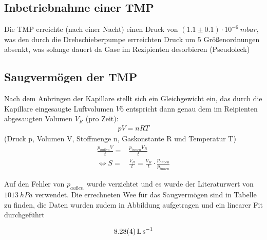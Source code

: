 \documentclass[12pt, a4paper]{scrartcl}
\begin{document}
    \subsection{Inbetriebnahme einer TMP}
    
        Die TMP erreichte (nach einer Nacht) einen Druck von 
        $(1.1\pm 0.1)\cdot10^{-6}\ mbar$, 
        was den durch die Drehschieberpumpe errreichten Druck um 5
        Größenordnungen absenkt, was solange dauert da Gase im Rezipienten desorbieren (Pseudoleck)
        
    \subsection{Saugvermögen der TMP}
        
        Nach dem Anbringen der Kapillare stellt sich ein Gleichgewicht ein, das durch die Kapillare eingesaugte Luftvolumen $V6$ entspricht dann genau dem im Reipienten abgesaugten Volumen $V_R$ (pro Zeit):
        \begin{align}
            pV=nRT
        \end{align}
        (Druck p, Volumen V, Stoffmenge n, Gaskonstante R und Temperatur T)
        \begin{align}
            \frac{p_{außen}V}{t} =& \frac{p_{innen}V_R}{t}\\
            \Leftrightarrow S=&\frac{V_R}{t}=\frac{V_R}{t}\cdot \frac{p_{außen}}{p_{innen}}
        \end{align}
	
        Auf den Fehler von $p_{außen}$ wurde verzichtet und es wurde der Literaturwert von $1013\ hPa$ verwendet.
        Die errechneten Wee für das Saugvermögen sind in Tabelle
        zu finden, die Daten wurden zudem in Abbildung
        aufgetragen und ein linearer Fit durchgeführt
        
        \begin{align*}
            \SI{8.28+-0.04}{\litre\per\second}
        \end{align*}
        
\end{document}

